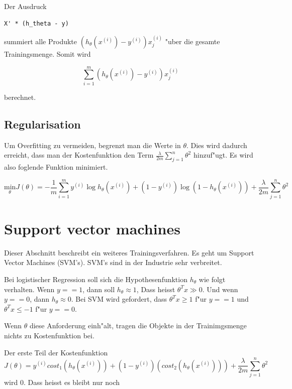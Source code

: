 \documentclass[12pt,a4paper,twoside]{article}
\begin{document}
Der Ausdruck 
\begin{lstlisting}
X' * (h_theta - y)
\end{lstlisting}
summiert alle Produkte $(h_{\theta} (x^{(i)}) - y^{(i)})x_j^{(i)}  $ "uber die gesamte Trainingsmenge. Somit wird

\begin{equation}
   \sum_{i=1}^m (h_{\theta} (x^{(i)}) - y^{(i)})x_j^{(i)}
\end{equation}

berechnet.

\subsection{Regularisation}
\label{sec:regularization}

Um Overfitting zu vermeiden, begrenzt man die Werte in $\theta$. Dies wird dadurch erreicht, dass man der Kostenfunktion den Term $\frac{\lambda}{2m} \sum_{j=1}^n \theta^2$ hinzuf"ugt. Es wird also foglende Funktion minimiert.

\begin{equation}
  \label{eq:regularization}
  \underset{\theta}{\text{min}}  J(\theta) = -\frac{1}{m} \sum_{i=1}^m y^{(i)} \log h_{\theta}(x^{(i)}) + (1 - y^{(i)}) \log(1 - h_{\theta}(x^{(i)}))+\frac{\lambda}{2m} \sum_{j=1}^n \theta^2
\end{equation}

\section{Support vector machines}
\label{sec:svm}

Dieser Abschnitt beschreibt ein weiteres Trainingsverfahren. Es geht um Support Vector Machines (SVM's). SVM's sind in der Industrie sehr verbreitet.

Bei logistischer Regression soll sich die Hypothesenfunktion $h_{\theta}$ wie folgt verhalten.
Wenn $y == 1$, dann soll $h_{\theta} \approx 1$, Dass heisst $\theta^T x \gg 0$. Und wenn $y == 0$, dann $h_{\theta} \approx 0$. Bei SVM wird gefordert, dass $\theta^T x \geq 1$ f"ur $y == 1$ und $\theta^T x \leq -1$ f"ur $y == 0$.

Wenn $\theta$ diese Anforderung einh"alt, tragen die Objekte in der Trainimgsmenge nichts zu Kostenfunktion bei.

Der erste Teil der Kostenfunktion 
\begin{equation}
  \label{eq:costsvm}
J(\theta) = y^{(i)} cost_1(h_{\theta}(x^{(i)})) + (1 - y^{(i)})(cost_2(h_{\theta}(x^{(i)}))) + \frac{\lambda}{2m} \sum_{j=1}^n \theta^2
\end{equation}
wird 0. Dass heisst es bleibt nur noch
\end{document}
